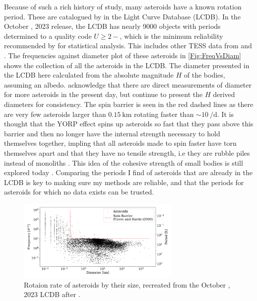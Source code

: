 \documentclass{UCreport}
\begin{document}
Because of such a rich history of study, many asteroids have a known rotation period.
These are catalogued by \citet{Warner2009} %
in the Light Curve Database (LCDB).
In the October , 2023 release, the LCDB has nearly 9000 objects with periods determined to a quality code $U\geq 2-$, which is the minimum reliability recommended by \citeauthor{Warner2009} for statistical analysis.
This includes other TESS data from \citet{Pal2020} and \citet{Woods2021}.
The frequencies against diameter plot of these asteroids in \autoref{Fig:FreqVsDiam} shows the collection of all the asteroids in the LCDB.
The diameter presented in the LCDB here calculated from the absolute magnitude $H$ of the bodies, assuming an albedo.
\citeauthor{Warner2009} acknowledge that there are direct measurements of diameter for more asteroids in the present day, but continue to present the $H$ derived diameters for consistency.
The spin barrier \citep{Pravec2000} is seen in the red dashed lines as there are very few asteroids larger than $\qty{0.15}{\kilo\metre}$ rotating faster than $\sim \qty{10}{\per\day}$.
It is thought that the YORP effect spins up asteroids so fast that they pass above this barrier and then no longer have the internal strength necessary to hold themselves together, impling that all asteroids made to spin faster have torn themselves apart and that they have no tensile strength, i.e they are rubble piles instead of monoliths \citep{Harris1996}. This idea of the cohesive strength of small bodies is still explored today \citep[e.g.][for V-type asteroids]{Oszkiewicz2020}.
Comparing the periods I find of asteroids that are already in the LCDB is key to making sure my methods are reliable, and that the periods for asteroids for which no data exists can be trusted.

\begin{figure}[t!]
  \centering
  \includegraphics[width=0.7\textwidth]{../Test Code/Testing Figures/Diam-FreqPlot.pdf}
  \caption[Asteroid frequencies vs diameter (LCDB)]{
    Rotaion rate of asteroids by their size, recreated from the  October , 2023 LCDB after \citet{Warner2009}.
  }
  \label{Fig:FreqVsDiam}
\end{figure}
\end{document}

